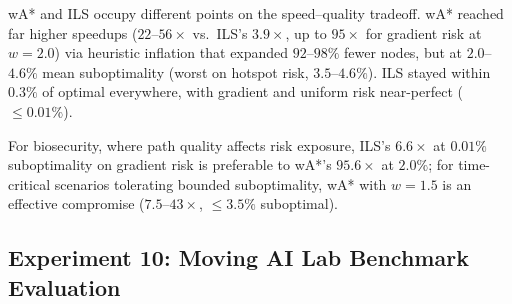 \documentclass[11pt]{article}
\begin{document}
\begin{table}[!htbp]
\centering
\caption{Weighted A* vs.\ ILS at $\lambda = 1.0$ (mean across three densities, 50 maps each, random start--goal pairs). Speedup relative to A*; Opt = mean path cost ratio $\pm$ 95\% CI.}
\label{tab:exp6_wa}
\end{table}

wA* and ILS occupy different points on the speed--quality tradeoff. wA* reached far higher speedups ($22$--$56\times$ vs.\ ILS's $3.9\times$, up to $95\times$ for gradient risk at $w = 2.0$) via heuristic inflation that expanded $92$--$98\%$ fewer nodes, but at $2.0$--$4.6\%$ mean suboptimality (worst on hotspot risk, $3.5$--$4.6\%$). ILS stayed within $0.3\%$ of optimal everywhere, with gradient and uniform risk near-perfect ($\leq 0.01\%$).

For biosecurity, where path quality affects risk exposure, ILS's $6.6\times$ at $0.01\%$ suboptimality on gradient risk is preferable to wA*'s $95.6\times$ at $2.0\%$; for time-critical scenarios tolerating bounded suboptimality, wA* with $w = 1.5$ is an effective compromise ($7.5$--$43\times$, $\leq 3.5\%$ suboptimal).

\subsection{Experiment 10: Moving AI Lab Benchmark Evaluation}
\end{document}
